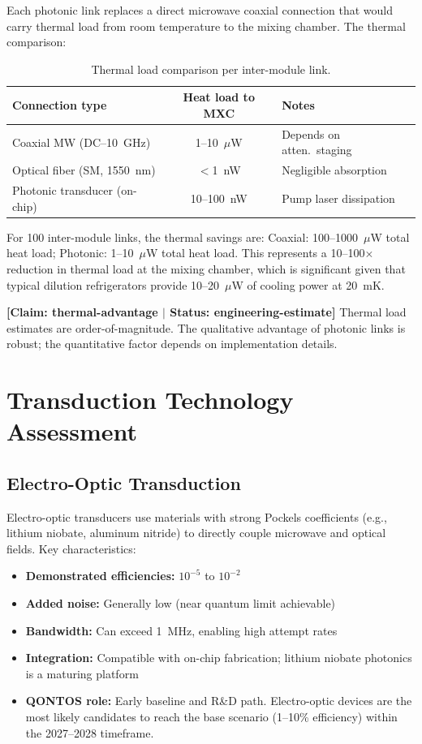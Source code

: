 \documentclass[conference]{IEEEtran}
\begin{document}
Each photonic link replaces a direct microwave coaxial connection that would carry thermal load from room temperature to the mixing chamber. The thermal comparison:

\begin{table}[H]
\centering
\caption{Thermal load comparison per inter-module link.}
\label{tab:thermal-load}
\footnotesize
\begin{tabularx}{\columnwidth}{L{2.5cm}cL{3.0cm}}
\toprule
\textbf{Connection type} & \textbf{Heat load to MXC} & \textbf{Notes} \\
\midrule
Coaxial MW (DC--10~GHz) & 1--10~$\mu$W & Depends on atten.\ staging \\
Optical fiber (SM, 1550~nm) & $<$1~nW & Negligible absorption \\
Photonic transducer (on-chip) & 10--100~nW & Pump laser dissipation \\
\bottomrule
\end{tabularx}
\end{table}

For 100 inter-module links, the thermal savings are: Coaxial: 100--1000~$\mu$W total heat load; Photonic: 1--10~$\mu$W total heat load. This represents a 10--100$\times$ reduction in thermal load at the mixing chamber, which is significant given that typical dilution refrigerators provide 10--20~$\mu$W of cooling power at 20~mK.

\textbf{[Claim: thermal-advantage $|$ Status: engineering-estimate]} Thermal load estimates are order-of-magnitude. The qualitative advantage of photonic links is robust; the quantitative factor depends on implementation details.

\section{Transduction Technology Assessment}

\subsection{Electro-Optic Transduction}

Electro-optic transducers use materials with strong Pockels coefficients (e.g., lithium niobate, aluminum nitride) to directly couple microwave and optical fields. Key characteristics:

\begin{itemize}
\item \textbf{Demonstrated efficiencies:} $10^{-5}$ to $10^{-2}$~\cite{Mirhosseini2020, Lauk2020}
\item \textbf{Added noise:} Generally low (near quantum limit achievable)
\item \textbf{Bandwidth:} Can exceed 1~MHz, enabling high attempt rates
\item \textbf{Integration:} Compatible with on-chip fabrication; lithium niobate photonics is a maturing platform
\item \textbf{QONTOS role:} Early baseline and R\&D path. Electro-optic devices are the most likely candidates to reach the base scenario (1--10\% efficiency) within the 2027--2028 timeframe.
\end{itemize}
\end{document}
